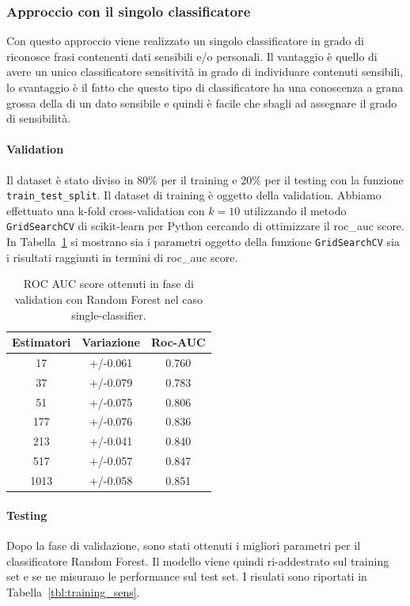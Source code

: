 \subsubsection{Approccio con il singolo classificatore}
\label{sssec:singleclass}
Con questo approccio viene realizzato un singolo classificatore in grado di riconosce frasi contenenti dati sensibili e/o personali. Il vantaggio è quello di avere un unico classificatore sensitività in grado di individuare contenuti sensibili, lo svantaggio è il fatto che questo tipo di classificatore ha una conoscenza a grana grossa della di un dato sensibile e quindi è facile che sbagli ad assegnare il grado di sensibilità.

\paragraph{Validation} Il dataset è stato diviso in 80\% per il training e 20\% per il testing con la funzione {\tt train\_test\_split}. Il dataset di training è oggetto della validation. Abbiamo effettuato una k-fold cross-validation con $k=10$ utilizzando il metodo {\tt GridSearchCV} di scikit-learn per Python cercando di ottimizzare il roc\_auc score. In Tabella~\ref{tbl:validation_sens} si mostrano sia i parametri oggetto della funzione {\tt GridSearchCV} sia i risultati raggiunti in termini di roc\_auc score. 
\begin{table}[h]
\label{tbl:validation_sens}
\centering
\begin{tabular}{|c|c|c|}
\hline
\textbf{Estimatori} & \textbf{Variazione} & \textbf{Roc-AUC} \\ \hline
17 & +/-0.061 & 0.760 \\ \hline
37 & +/-0.079 & 0.783 \\ \hline
51 & +/-0.075 & 0.806 \\ \hline
177 & +/-0.076 & 0.836 \\ \hline
213 & +/-0.041 & 0.840 \\ \hline
517 & +/-0.057 & 0.847 \\ \hline
1013 & +/-0.058 & 0.851 \\ \hline
\end{tabular}
\caption{ROC AUC score ottenuti in fase di validation con Random Forest nel caso single-classifier.}
\end{table}
\FloatBarrier

\paragraph{Testing} Dopo la fase di validazione, sono stati ottenuti i migliori parametri per il classificatore Random Forest. Il modello viene quindi ri-addestrato sul training set e se ne misurano le performance sul test set. I risulati sono riportati in Tabella~\ref{tbl:training_sens}.

